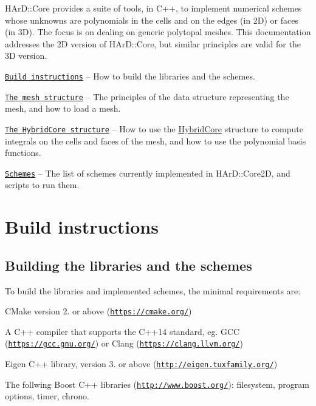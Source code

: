 H\+Ar\+D\+::\+Core provides a suite of tools, in C++, to implement numerical schemes whose unknowns are polynomials in the cells and on the edges (in 2D) or faces (in 3D). The focus is on dealing on generic polytopal meshes. This documentation addresses the 2D version of H\+Ar\+D\+::\+Core, but similar principles are valid for the 3D version.


\begin{DoxyItemize}
\item \href{#build}{\tt Build instructions} -- How to build the libraries and the schemes.
\item \href{#mesh}{\tt The mesh structure} -- The principles of the data structure representing the mesh, and how to load a mesh.
\item \href{#hybridcore}{\tt The Hybrid\+Core structure} -- How to use the \hyperlink{classHArDCore2D_1_1HybridCore}{Hybrid\+Core} structure to compute integrals on the cells and faces of the mesh, and how to use the polynomial basis functions.
\item \href{#schemes}{\tt Schemes} -- The list of schemes currently implemented in H\+Ar\+D\+::\+Core2D, and scripts to run them.
\end{DoxyItemize}

\label{_build}%
 \hypertarget{index_build}{}\section{Build instructions}\label{index_build}
\hypertarget{index_buildlib}{}\subsection{Building the libraries and the schemes}\label{index_buildlib}
To build the libraries and implemented schemes, the minimal requirements are\+:


\begin{DoxyItemize}
\item C\+Make version 2. or above (\href{https://cmake.org/}{\tt https\+://cmake.\+org/})
\item A C++ compiler that supports the C++14 standard, eg. G\+CC (\href{https://gcc.gnu.org/}{\tt https\+://gcc.\+gnu.\+org/}) or Clang (\href{https://clang.llvm.org/}{\tt https\+://clang.\+llvm.\+org/})
\item Eigen C++ library, version 3. or above (\href{http://eigen.tuxfamily.org/}{\tt http\+://eigen.\+tuxfamily.\+org/})
\item The follwing Boost C++ libraries (\href{http://www.boost.org/}{\tt http\+://www.\+boost.\+org/})\+: filesystem, program options, timer, chrono.
\end{DoxyItemize}

